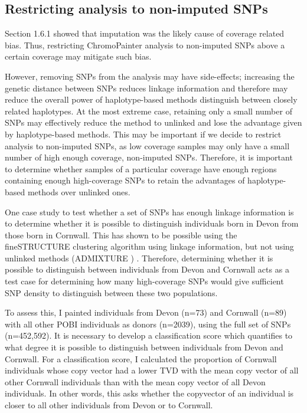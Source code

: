 \subsection{Restricting analysis to non-imputed SNPs}

Section 1.6.1 showed that imputation was the likely cause of coverage related bias. Thus, restricting ChromoPainter analysis to non-imputed SNPs above a certain coverage may mitigate such bias.

However, removing SNPs from the analysis may have side-effects; increasing the genetic distance between SNPs reduces linkage information and therefore may reduce the overall power of haplotype-based methods distinguish between closely related haplotypes. At the most extreme case, retaining only a small number of SNPs may effectively reduce the method to unlinked and lose the advantage given by haplotype-based methods. This may be important if we decide to restrict analysis to non-imputed SNPs, as low coverage samples may only have a small number of high enough coverage, non-imputed SNPs. Therefore, it is important to determine whether samples of a particular coverage have enough regions containing enough high-coverage SNPs to retain the advantages of haplotype-based methods over unlinked ones. 

One case study to test whether a set of SNPs has enough linkage information is to determine whether it is possible to distinguish individuals born in Devon from those born in Cornwall. This has shown to be possible using the fineSTRUCTURE clustering algorithm using linkage information, but not using unlinked methods (ADMIXTURE \cite{alexander2009fast}) \cite{Leslie2015}. Therefore, determining whether it is possible to distinguish between individuals from Devon and Cornwall acts as a test case for determining how many high-coverage SNPs would give sufficient SNP density to distinguish between these two populations.

To assess this, I painted individuals from Devon (n=73) and Cornwall (n=89) with all other POBI individuals as donors (n=2039), using the full set of SNPs (n=452,592). It is necessary to develop a classification score which quantifies to what degree it is possible to distinguish between individuals from Devon and Cornwall. For a classification score, I calculated the proportion of Cornwall individuals whose copy vector had a lower TVD with the mean copy vector of all other Cornwall individuals than with the mean copy vector of all Devon individuals. In other words, this asks whether the copyvector of an individual is closer to all other individuals from Devon or to Cornwall.

